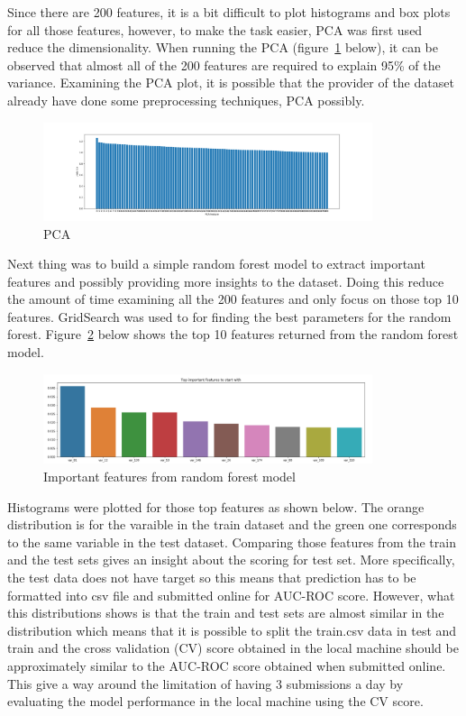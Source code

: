 \documentclass[journal,twoside,web]{ieeecolor}
\begin{document}
Since there are 200 features, it is a bit difficult to plot histograms and box plots for all those features, however, to make the task easier, PCA was first used reduce the dimensionality. When running the PCA (figure~\ref{fig:fig2} below), it can be observed that almost all of the 200 features are required to explain 95\% of the variance. Examining the PCA plot, it is possible that the provider of the dataset already have done some preprocessing techniques, PCA possibly. 
\begin{figure}[h!]
  \centering
  \includegraphics[width=3.8in]{project/code/1-pcafeatures.png}
  \caption{PCA}
  \label{fig:fig2}
\end{figure}
Next thing was to build a simple random forest model to extract important features and possibly providing more insights to the dataset. Doing this reduce the amount of time examining all the 200 features and only focus on those top 10 features. GridSearch was used to for finding the best parameters for the random forest. Figure~\ref{fig:fig3} below shows the top 10 features returned from the random forest model. 
\begin{figure}[h!]
  \centering
  \includegraphics[width=3.8in]{project/code/important features.png}
  \caption{Important features from random forest model}
  \label{fig:fig3}
\end{figure}
Histograms were plotted for those top features as shown below. The orange distribution is for the varaible in the train dataset and the green one corresponds to the same variable in the test dataset. Comparing those features from the train and the test sets gives an insight about the scoring for test set. More specifically, the test data does not have target so this means that prediction has to be formatted into csv file and submitted online for AUC-ROC score. However, what this distributions shows is that the train and test sets are almost similar in the distribution which means that it is possible to split the train.csv data in test and train and the cross validation (CV) score obtained in the local machine should be approximately similar to the AUC-ROC score obtained when submitted online. This give a way around the limitation of having 3 submissions a day by evaluating the model performance in the local machine using the CV score. 
\end{document}
